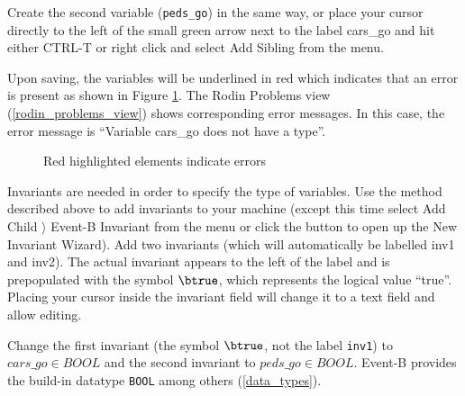 Create the second variable (\texttt{peds\_go}) in the same way, or place your cursor directly to the left of the small green arrow next to the label \textsf{cars\_go} and hit either \textsf{CTRL-T} or right click and select \textsf{Add Sibling} from the menu.


Upon saving, the variables will be underlined in red which indicates that an error is present as shown in Figure \ref{fig_tut_03_error}.  The \textsf{Rodin Problems} view (\ref{rodin_problems_view}) shows corresponding error messages. In this case, the error message is ``Variable cars\_go does not have a type''.

\begin{figure}[!ht]
\begin{center}
	\caption{Red highlighted elements indicate errors}
	\label{fig_tut_03_error}
\end{center}
\end{figure}

Invariants are needed in order to specify the type of variables. Use the method described above to add invariants to your machine (except this time select \textsf{Add Child $\rangle$ Event-B Invariant} from the menu or click the  button to open up the New Invariant Wizard). Add two invariants (which will automatically be labelled \textsf{inv1} and \textsf{inv2}). The actual invariant appears to the left of the label and is prepopulated with the symbol $\btrue$, which represents the logical value ``true''. Placing your cursor inside the invariant field will change it to a text field and allow editing. 

Change the first invariant (the symbol $\btrue$, not the label \texttt{inv1}) to $cars\_go \in  BOOL$ and the second invariant to $peds\_go \in  BOOL$.
Event-B provides the build-in datatype \texttt{BOOL} among others (\ref{data_types}).

